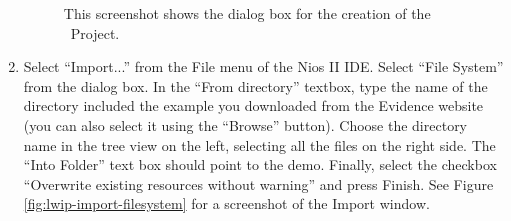 \begin{enumerate}
\begin{figure}
\caption{\label{fig:lwip_rtdruid_project}This screenshot shows the
dialog box for the creation of the \rtd\ Project.}
\end{figure}
%
\item Select ``Import...'' from the File menu of the Nios II
  IDE. Select ``File System'' from the dialog box. In the ``From
  directory'' textbox, type the name of the  directory
  included the example you downloaded from the Evidence website (you
  can also select it using the ``Browse'' button). Choose the
  directory name in the tree view on the left, selecting all the files
  on the right side. The ``Into Folder'' text box should point to the
   demo. Finally, select the checkbox ``Overwrite
  existing resources without warning'' and press Finish. See Figure
  \ref{fig:lwip-import-filesystem} for a screenshot of the Import
  window.
%
\begin{figure}


\end{figure}
\end{enumerate}
